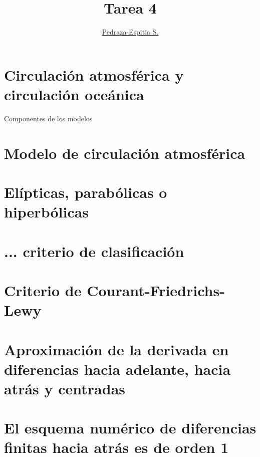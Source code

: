 \documentclass{article}
\title{Tarea 4}
\author{\href{https://git.io/salvador}{Pedraza-Espitia S.}}
\date{}
\begin{document}
\maketitle

\section{Circulación atmosférica y circulación oceánica}
Componentes de los modelos

\section{Modelo de circulación atmosférica}

\section{Elípticas, parabólicas o hiperbólicas}

\section{... criterio de clasificación}

\section{Criterio de Courant-Friedrichs-Lewy}

\newcommand\derord[3][]{
\def\temp{#1}\ifx\temp\empty
	\ensuremath {\left( \dfrac{\mathrm{d}#2}{\mathrm{d}#3}}
	\right)_j%
\else
	\ensuremath {\left(
	\dfrac{\mathrm{d}^#1#2}{\mathrm{d}#3^#1}} \right)_j%
\fi}
\newcommand\Dt{\ensuremath {\left( \Delta t \right)}}
\newcommand\Dx{\ensuremath {\left( \Delta x \right)}}
\newcommand\dDx{\ensuremath {\left( 2\Delta x \right)}}
\newcommand\dxdero[3]{\ensuremath {\Dt^{\the\numexpr #3 - 1\relax} \derord[#3]{#1}{#2} }}

\section{Aproximación de la derivada en diferencias hacia adelante, hacia atrás y centradas}

\section{El esquema numérico de diferencias finitas hacia atrás es de orden 1}
\end{document}
